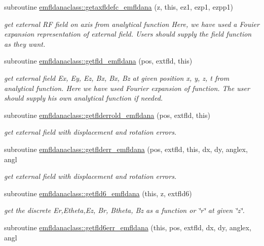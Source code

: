 \begin{DoxyCompactItemize}
subroutine \mbox{\hyperlink{namespaceemfldanaclass_a458770ca16d15a091232d5067c282f5a}{emfldanaclass\+::getaxfldefc\+\_\+emfldana}} (z, this, ez1, ezp1, ezpp1)
\begin{DoxyCompactList}\small\item\em get external RF field on axis from analytical function Here, we have used a Fouier expansion representation of external field. Users should supply the field function as they want. \end{DoxyCompactList}\item 
subroutine \mbox{\hyperlink{namespaceemfldanaclass_abf2e2171f7b0a3aa36462d1965e428f4}{emfldanaclass\+::getfld\+\_\+emfldana}} (pos, extfld, this)
\begin{DoxyCompactList}\small\item\em get external field Ex, Ey, Ez, Bx, Bx, Bz at given position x, y, z, t from analytical function. Here we have used Fourier expansion of function. The user should supply his own analytical function if needed. \end{DoxyCompactList}\item 
subroutine \mbox{\hyperlink{namespaceemfldanaclass_a653a95a05e7093fca664a1a8ba38e991}{emfldanaclass\+::getflderrold\+\_\+emfldana}} (pos, extfld, this)
\begin{DoxyCompactList}\small\item\em get external field with displacement and rotation errors. \end{DoxyCompactList}\item 
subroutine \mbox{\hyperlink{namespaceemfldanaclass_a95772a7b3030b57d7c0753ef96a2f764}{emfldanaclass\+::getflderr\+\_\+emfldana}} (pos, extfld, this, dx, dy, anglex, angl
\begin{DoxyCompactList}\small\item\em get external field with displacement and rotation errors. \end{DoxyCompactList}\item 
subroutine \mbox{\hyperlink{namespaceemfldanaclass_a3ff336abdafaac7ad874da092e6365ed}{emfldanaclass\+::getfld6\+\_\+emfldana}} (this, z, extfld6)
\begin{DoxyCompactList}\small\item\em get the discrete Er,Etheta,Ez, Br, Btheta, Bz as a function or \char`\"{}r\char`\"{} at given \char`\"{}z\char`\"{}. \end{DoxyCompactList}\item 
subroutine \mbox{\hyperlink{namespaceemfldanaclass_af8390aa825a9ca8733745551ee96bc17}{emfldanaclass\+::getfld6err\+\_\+emfldana}} (this, pos, extfld, dx, dy, anglex, angl

\end{DoxyCompactItemize}
